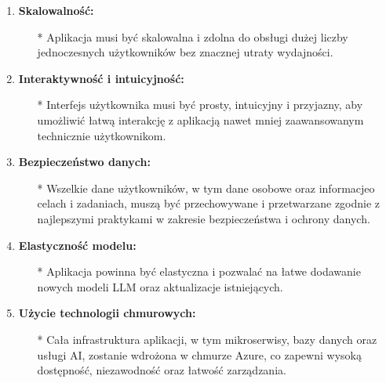 \begin{enumerate}
    \item {\bf Skalowalność:}
        \begin{itemize}
            \item[*] Aplikacja musi być skalowalna i zdolna do obsługi dużej liczby jednoczesnych użytkowników bez znacznej utraty wydajności.
       \end{itemize}
    
    \item {\bf Interaktywność i intuicyjność:}
        \begin{itemize}
            \item[*] Interfejs użytkownika musi być prosty, intuicyjny i przyjazny, aby umożliwić łatwą interakcję z aplikacją nawet mniej zaawansowanym technicznie użytkownikom.
       \end{itemize}
    
    \item {\bf Bezpieczeństwo danych:}
        \begin{itemize}
            \item[*] Wszelkie dane użytkowników, w tym dane osobowe oraz informacje\linebreak o celach i zadaniach, muszą być przechowywane i przetwarzane zgodnie z najlepszymi praktykami w zakresie bezpieczeństwa i ochrony danych.
       \end{itemize}
    
    \item {\bf Elastyczność modelu:}
        \begin{itemize}
            \item[*] Aplikacja powinna być elastyczna i pozwalać na łatwe dodawanie nowych modeli LLM oraz aktualizacje istniejących.
       \end{itemize}
    
    \item {\bf Użycie technologii chmurowych:}
        \begin{itemize}
            \item[*] Cała infrastruktura aplikacji, w tym mikroserwisy, bazy danych oraz usługi AI, zostanie wdrożona w chmurze Azure, co zapewni wysoką dostępność, niezawodność oraz łatwość zarządzania.
       \end{itemize}
\end{enumerate}

